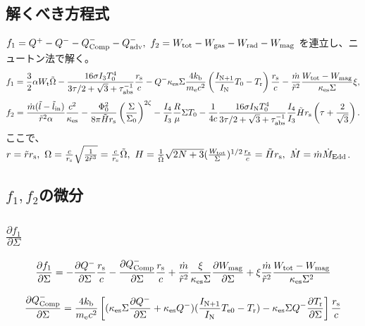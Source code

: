 \documentclass[11pt, oneside]{article}   	%
\begin{document}
\subsection{解くべき方程式}
$f_1 = Q^+ - Q^- - Q^-_{\rm Comp} - Q^-_{\rm adv},\  f_2 = W_{\rm tot} - W_{\rm gas} - W_{\rm rad} - W_{\rm mag}$ を連立し、ニュートン法で解く。
\begin{equation}
	f_1 = \frac{3}{2}\alpha W_{\rm t}\tilde\Omega - \frac{16\sigma I_3T_0^4}{3\tau/2 + \sqrt{3} + \tau_{\rm abs}^{-1}}\frac{r_{\rm s}}{c} - Q^-\kappa_{\rm es}\Sigma\frac{4k_{\rm b}}{m_{\rm e}c^2}\left( \frac{I_{\rm N+1}}{I_{\rm N}}T_0 - T_{\rm r}\right)\frac{r_{\rm s}}{c} -\frac{\dot{m}}{\tilde r^2}\frac{W_{\rm tot} - W_{\rm mag}}{\kappa_{\rm es}\Sigma}\xi,
\end{equation}
\begin{equation}
	f_2 = \frac{\dot{m}(\tilde{l} - \tilde{l}_{\rm in})}{\tilde r^2\alpha}\frac{c^2}{\kappa_{\rm es}} - \frac{\Phi_0^2}{8\pi \tilde Hr_{\rm s}}\left(\frac{\Sigma}{\Sigma_0}\right)^{2\zeta} - \frac{I_4}{I_3}\frac{R}{\mu}\Sigma T_0 - \frac{1}{4c}  \frac{16\sigma I_{\rm N}T_0^4}{3\tau/2 + \sqrt{3} + \tau_{\rm abs}^{-1}} \frac{I_4}{I_3}\tilde Hr_{\rm s}\left(\tau + \frac{2}{\sqrt{3}}\right).
\end{equation}
ここで、$r=\tilde rr_{\rm s},\ \Omega = \frac{c}{r_{\rm s}}\sqrt{\frac{1}{2\tilde r^3}} = \frac{c}{r_{\rm s}}\tilde\Omega,\ H = \frac{1}{\tilde\Omega}\sqrt{2N+3}(\frac{W_{\rm tot}}{\Sigma})^{1/2}\frac{r_{\rm s}}{c}=\tilde Hr_{\rm s},\ \dot{M}=\dot{m}\dot{M}_{\rm Edd}$.

\subsection{$f_1,f_2$の微分}
\subsection*{$\displaystyle\frac{\partial f_1}{\partial\Sigma}$}
\begin{equation}
	\frac{\partial f_1}{\partial \Sigma} = - \frac{\partial Q^-}{\partial\Sigma}\frac{r_{\rm s}}{c} - \frac{\partial Q^-_{\rm Comp}}{\partial\Sigma}\frac{r_{\rm s}}{c} + \frac{\dot{m}}{\tilde r^2}\frac{\xi}{\kappa_{\rm es}\Sigma}\frac{\partial W_{\rm mag}}{\partial\Sigma} + \xi\frac{\dot{m}}{\tilde r^2}\frac{W_{\rm tot}-W_{\rm mag}}{\kappa_{\rm es}\Sigma^2}
\end{equation}

\begin{equation}
	\frac{\partial Q^-_{\rm Comp}}{\partial\Sigma} = \frac{4k_{\rm b}}{m_{\rm e}c^2}\left[ (\kappa_{\rm es}\Sigma\frac{\partial Q^-}{\partial\Sigma} + \kappa_{\rm es}Q^-)(\frac{I_{\rm N+1}}{I_{\rm N}}T_{\rm e0} - T_{\rm r}) - \kappa_{\rm es}\Sigma Q^-\frac{\partial T_{\rm r}}{\partial\Sigma} \right]\frac{r_{\rm s}}{c}
\end{equation}
\end{document}
